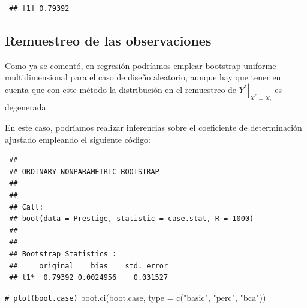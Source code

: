 \documentclass[
  10pt,
]{book}
\newenvironment{Shaded}{\begin{snugshade}}{\end{snugshade}}
\newcommand{\AttributeTok}[1]{\textcolor[rgb]{0.77,0.63,0.00}{#1}}
\newcommand{\CommentTok}[1]{\textcolor[rgb]{0.56,0.35,0.01}{\textit{#1}}}
\newcommand{\ControlFlowTok}[1]{\textcolor[rgb]{0.13,0.29,0.53}{\textbf{#1}}}
\newcommand{\DecValTok}[1]{\textcolor[rgb]{0.00,0.00,0.81}{#1}}
\newcommand{\FunctionTok}[1]{\textcolor[rgb]{0.00,0.00,0.00}{#1}}
\newcommand{\NormalTok}[1]{#1}
\newcommand{\OtherTok}[1]{\textcolor[rgb]{0.56,0.35,0.01}{#1}}
\newcommand{\SpecialCharTok}[1]{\textcolor[rgb]{0.00,0.00,0.00}{#1}}
\newcommand{\StringTok}[1]{\textcolor[rgb]{0.31,0.60,0.02}{#1}}
\theoremstyle{break}
\theoremstyle{nonumberplain}
\renewcommand{\CommentTok}[1]{\textcolor[rgb]{0.41,0.41,0.41}{\texttt{#1}}}
\begin{document}
\begin{verbatim}
 ## [1] 0.79392
\end{verbatim}

\hypertarget{boot-unif-reg}{%
\subsection{Remuestreo de las observaciones}\label{boot-unif-reg}}

Como ya se comentó, en regresión podríamos emplear bootstrap uniforme multidimensional para el caso de diseño aleatorio, aunque hay que tener en cuenta que con este método la distribución en el remuestreo de \(\left. Y^{\ast}\right\vert _{X^{\ast}=X_i}\) es degenerada.

En este caso, podríamos realizar inferencias sobre el coeficiente de determinación ajustado empleando el siguiente código:

\begin{Shaded}
\end{Shaded}

\begin{verbatim}
 ## 
 ## ORDINARY NONPARAMETRIC BOOTSTRAP
 ## 
 ## 
 ## Call:
 ## boot(data = Prestige, statistic = case.stat, R = 1000)
 ## 
 ## 
 ## Bootstrap Statistics :
 ##     original    bias    std. error
 ## t1*  0.79392 0.0024956    0.031527
\end{verbatim}

\begin{Shaded}
\begin{Highlighting}[]
\CommentTok{\# plot(boot.case)}
\FunctionTok{boot.ci}\NormalTok{(boot.case, }\AttributeTok{type =} \FunctionTok{c}\NormalTok{(}\StringTok{"basic"}\NormalTok{, }\StringTok{"perc"}\NormalTok{, }\StringTok{"bca"}\NormalTok{))}
\end{Highlighting}
\end{Shaded}
\end{document}
